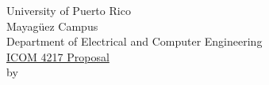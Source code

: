 \begin{titlepage}
  \begin{center}
    University of Puerto Rico\\
    Mayagüez Campus\\
    \vspace{\baselineskip}
    Department of Electrical and Computer Engineering\\
    \vspace{3cm}
    \underline{ICOM 4217 Proposal}\\
    by
  \end{center}
\end{titlepage}
